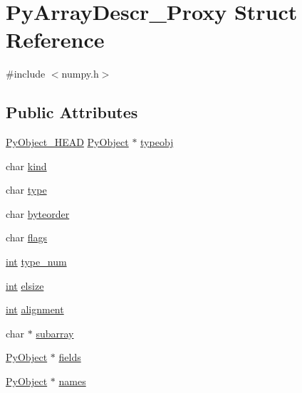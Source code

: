 \hypertarget{struct_py_array_descr___proxy}{}\section{Py\+Array\+Descr\+\_\+\+Proxy Struct Reference}
\label{struct_py_array_descr___proxy}


{\ttfamily \#include $<$numpy.\+h$>$}

\subsection*{Public Attributes}
\begin{DoxyCompactItemize}
\item 
\mbox{\hyperlink{_python27_2object_8h_a0bf35c1f3ea13f925de94d8593db3b7e}{Py\+Object\+\_\+\+H\+E\+AD}} \mbox{\hyperlink{_python27_2object_8h_aadc84ac7aed2cfa6f20c25f62bf3dac7}{Py\+Object}} $\ast$ \mbox{\hyperlink{struct_py_array_descr___proxy_aa8fe65eb0a7bfd03529b30482650b14d}{typeobj}}
\item 
char \mbox{\hyperlink{struct_py_array_descr___proxy_a12763536bf0fd9623822ceb0c5a7ef90}{kind}}
\item 
char \mbox{\hyperlink{struct_py_array_descr___proxy_ac63d5c71249d3f1bbeb7d46d8827a431}{type}}
\item 
char \mbox{\hyperlink{struct_py_array_descr___proxy_a61509a48a2ab8f68306c5be3dce5cd96}{byteorder}}
\item 
char \mbox{\hyperlink{struct_py_array_descr___proxy_abc82aea571609f0e5c793aeac8293dd9}{flags}}
\item 
\mbox{\hyperlink{warnings_8h_a74f207b5aa4ba51c3a2ad59b219a423b}{int}} \mbox{\hyperlink{struct_py_array_descr___proxy_a5af00ff8ffab1568bc306598d57a09c9}{type\+\_\+num}}
\item 
\mbox{\hyperlink{warnings_8h_a74f207b5aa4ba51c3a2ad59b219a423b}{int}} \mbox{\hyperlink{struct_py_array_descr___proxy_af950ea270c0619c6fbe3ae3681a8f3fb}{elsize}}
\item 
\mbox{\hyperlink{warnings_8h_a74f207b5aa4ba51c3a2ad59b219a423b}{int}} \mbox{\hyperlink{struct_py_array_descr___proxy_a24f40a021070dcf283b52da41f3b8df5}{alignment}}
\item 
char $\ast$ \mbox{\hyperlink{struct_py_array_descr___proxy_aea35d52346fc71b7ebf7878a8d4bcbbb}{subarray}}
\item 
\mbox{\hyperlink{_python27_2object_8h_aadc84ac7aed2cfa6f20c25f62bf3dac7}{Py\+Object}} $\ast$ \mbox{\hyperlink{struct_py_array_descr___proxy_a6ed2bfc50a13cc581a35332713057f2d}{fields}}
\item 
\mbox{\hyperlink{_python27_2object_8h_aadc84ac7aed2cfa6f20c25f62bf3dac7}{Py\+Object}} $\ast$ \mbox{\hyperlink{struct_py_array_descr___proxy_a3575d3dba3b5524e7ebf546ea0119213}{names}}
\end{DoxyCompactItemize}


